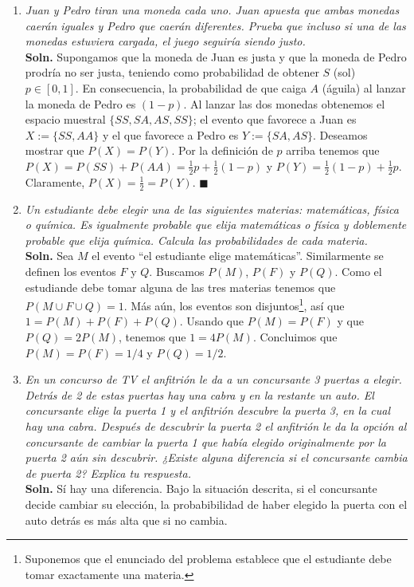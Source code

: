 \documentclass[letterpaper,11pt]{article}
\begin{document}
\begin{enumerate}
\item \emph{Juan y Pedro tiran una moneda cada uno. Juan apuesta que ambas monedas caerán iguales
y Pedro que caerán diferentes. Prueba que incluso si una de las monedas estuviera cargada, el juego
seguiría siendo justo.}\\
    {\bf Soln.} Supongamos que la moneda de Juan es justa y que la moneda de Pedro prodría no ser justa,
    teniendo como probabilidad de obtener $S$ (sol) $p\in  [0,1]$. En consecuencia, la
    probabilidad de que caiga $A$ (águila) al lanzar la moneda de Pedro es $(1-p)$. Al lanzar las dos 
    monedas obtenemos el espacio muestral $\{SS,SA,AS,SS\}$; el evento que favorece a Juan es 
    $X:=\{SS,AA\}$ y el que favorece a Pedro es $Y:=\{SA,AS\}$. Deseamos mostrar que $P(X)=P(Y)$.
    Por la definición de $p$ arriba tenemos que $P(X)=P(SS)+P(AA)=\frac{1}{2}p+\frac{1}{2}(1-p)$ y
    $P(Y)= \frac{1}{2}(1-p)+\frac{1}{2}p$. Claramente, $P(X)=\frac{1}{2}=P(Y)$. \hfill $\blacksquare$
\item \emph{Un estudiante debe elegir una de las siguientes materias: matemáticas, física o química. Es
igualmente probable que elija matemáticas o física y doblemente probable que elija química.
Calcula las probabilidades de cada materia.}\\
    {\bf Soln.} Sea $M$ el evento ``el estudiante elige matemáticas''. Similarmente se definen los eventos
    $F$ y $Q$. Buscamos $P(M)$, $P(F)$ y $P(Q)$. Como el estudiande debe tomar alguna de 
    las tres materias tenemos que $P(M\cup F\cup Q)=1$. Más aún, los eventos son disjuntos\footnote{Suponemos
    que el enunciado del problema establece que el estudiante debe tomar exactamente una materia.}, 
    así que $1=P(M)+P(F)+P(Q)$. Usando que $P(M)=P(F)$ y que $P(Q)=2P(M)$, tenemos que $1=4P(M)$.
    Concluimos que $P(M)=P(F)=1/4$ y $P(Q)=1/2$. 
\item \emph{En un concurso de TV el anfitrión le da a un concursante 3 puertas a elegir. Detrás de 2 de
estas puertas hay una cabra y en la restante un auto. El concursante elige la puerta 1 y el
anfitrión descubre la puerta 3, en la cual hay una cabra. Después de descubrir la puerta 2 el
anfitrión le da la opción al concursante de cambiar la puerta 1 que había elegido originalmente
por la puerta 2 aún sin descubrir. ¿Existe alguna diferencia si el concursante cambia de puerta
2? Explica tu respuesta.}\\
    {\bf Soln.} Sí hay una diferencia. Bajo la situación descrita, si el concursante decide cambiar 
    su elección, la probabibilidad de haber elegido la puerta con el auto detrás es más alta que si no cambia. 


\end{enumerate}
\end{document}

